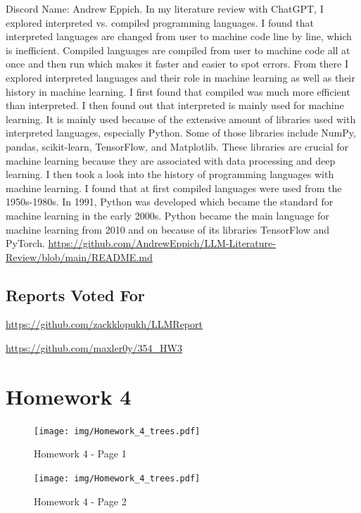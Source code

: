 \documentclass{article}
\theoremstyle{plain}
\theoremstyle{definition}
\theoremstyle{remark}
\begin{document}
Discord Name: Andrew Eppich.   
In my literature review with ChatGPT, I explored interpreted vs. compiled programming languages. I found that interpreted languages are changed from user to machine code line by line, which is inefficient. Compiled languages are compiled from user to machine code all at once and then run which makes it faster and easier to spot errors. From there I explored interpreted languages and their role in machine learning as well as their history in machine learning. I first found that compiled was much more efficient than interpreted. I then found out that interpreted is mainly used for machine learning. It is mainly used because of the extensive amount of libraries used with interpreted languages, especially Python. Some of those libraries include NumPy, pandas, scikit-learn, TensorFlow, and Matplotlib. These libraries are crucial for machine learning because they are associated with data processing and deep learning. I then took a look into the history of programming languages with machine learning. I found that at first compiled languages were used from the 1950s-1980s. In 1991, Python was developed which became the standard for machine learning in the early 2000s. Python became the main language for machine learning from 2010 and on because of its libraries TensorFlow and PyTorch. 
\url{https://github.com/AndrewEppich/LLM-Literature-Review/blob/main/README.md}

\subsection{Reports Voted For}

\url{https://github.com/zackklopukh/LLMReport}

\url{https://github.com/maxler0y/354_HW3}

\section{Homework 4}\label{homework4}

\begin{figure}[H]
  \centering
  \texttt{[image: img/Homework\_4\_trees.pdf]}
  \caption{Homework 4 - Page 1}
  \label{fig:homework4_page1}
\end{figure}

\begin{figure}[H]
  \centering
  \texttt{[image: img/Homework\_4\_trees.pdf]}
  \caption{Homework 4 - Page 2}
  \label{fig:homework4_page2}
\end{figure}
\end{document}
